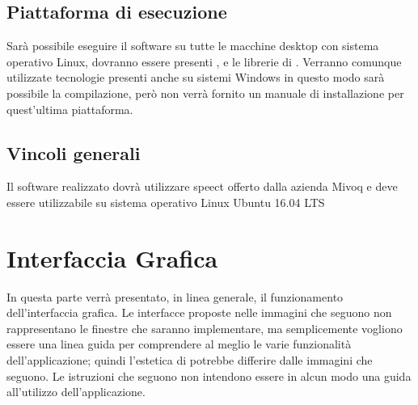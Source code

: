 \documentclass[../AnalisideiRequisiti.tex]{subfiles}
\begin{document}
\section{Piattaforma di esecuzione}
Sarà possibile eseguire il software su tutte le macchine desktop con sistema operativo Linux, dovranno essere presenti ,  e le librerie di . Verranno comunque utilizzate tecnologie presenti anche su sistemi Windows in questo modo sarà possibile la compilazione, però non verrà fornito un manuale di installazione per quest’ultima piattaforma.

\section{Vincoli generali}
Il software realizzato dovrà utilizzare speect offerto dalla azienda Mivoq e deve essere utilizzabile su sistema operativo Linux Ubuntu 16.04 LTS
	

\chapter{Interfaccia Grafica}
In questa parte verrà presentato, in linea generale, il funzionamento dell'interfaccia grafica. Le interfacce proposte nelle immagini che seguono non rappresentano le finestre che saranno implementare, ma semplicemente vogliono essere una linea guida per comprendere al meglio le varie funzionalità dell'applicazione; quindi l'estetica di \textit{} potrebbe differire dalle immagini che seguono. Le istruzioni che seguono non intendono essere in alcun modo una guida all'utilizzo dell'applicazione.
\end{document}
